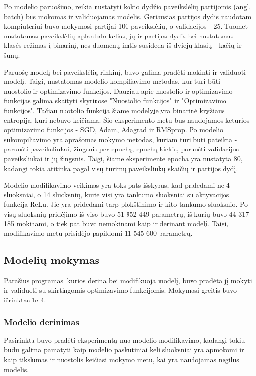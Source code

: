 \documentclass{VUMIFPSkursinis}
\begin{document}
Po modelio paruošimo, reikia nustatyti kokio dydžio paveikslėlių partijomis (angl. batch) bus mokomas ir validuojamas modelis. Geriausias partijos dydis naudotam kompiuteriui buvo mokymosi partijai 100 paveikslėlių, o validacijos - 25.
Tuomet nustatomas paveikslėlių aplankalo kelias, jų ir partijos dydis bei nustatomas klasės režimas į binarinį, nes duomenų imtis susideda iš dviejų klasių - kačių ir šunų.

Paruošę modelį bei paveikslėlių rinkinį, buvo galima pradėti mokinti ir validuoti modelį. Taigi, nustatomas modelio kompiliavimo metodas, kur turi būti - nuostolio ir 
optimizavimo funkcijos. Daugiau apie nuostolio ir optimizavimo funkcijas galima skaityti skyriuose "Nuostolio funkcijos" ir "Optimizavimo funkcijos". Tačiau nuotolio 
funkcija šiame modelyje yra binarinė kryžiaus entropija, kuri nebuvo keičiama. Šio eksperimento metu bus naudojamos keturios optimizavimo funkcijos - SGD, 
Adam, Adagrad ir RMSprop. Po modelio sukompiliavimo yra aprašomas mokymo metodas, kuriam turi būti pateikta - paruošti paveiksliukai, žingsnis per epochą, epochų kiekis, 
paruošti validacijos paveiksliukai ir jų žingsnis. Taigi, šiame eksperimente epocha yra nustatyta 80, kadangi tokia atitinka pagal visų turimų paveiksliukų skaičių ir partijos dydį.

Modelio modifikavimo veikimas yra toks pats išskyrus, kad pridedami ne 4 sluoksniai, o 14 sluoksnių, kurie visi yra tankumo sluoksniai su aktyvacijos funkcija ReLu. Jie yra 
pridedami tarp plokštinimo ir kito tankumo sluoksnio. Po visų sluoksnių pridėjimo iš viso buvo 51 952 449 parametrų, iš kurių buvo 44 317 185 mokinami, o tiek pat buvo nemokinami 
kaip ir derinant modelį. Taigi, modifikavimo metu prisidėjo papildomi 11 545 600 parametrų.

\subsection{Modelių mokymas}
Parašius programas, kurios derina bei modifikuoja modelį, buvo pradėta jį mokyti ir validuoti su skirtingomis optimizavimo funkcijomis.
Mokymosi greitis buvo išrinktas 1e-4.%
\subsubsection{Modelio derinimas}
Pasirinkta buvo pradėti eksperimentą nuo modelio modifikavimo, kadangi tokiu būdu galima pamatyti kaip modelio paskutiniai keli sluoksniai yra apmokomi ir kaip tikslumas ir nuostolis 
keičiasi mokymo metu, kai yra naudojamas negilus modelis.
\end{document}
